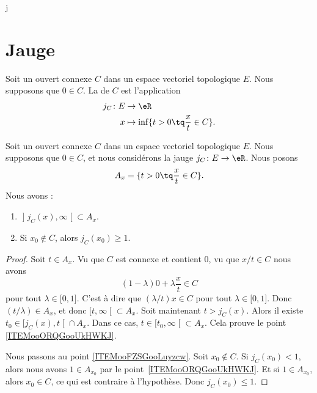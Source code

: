 j%

\section{Jauge}


\begin{definition}	\label{DEFooRNZBooLSdowc}
	Soit un ouvert connexe \( C\) dans un espace vectoriel topologique \( E\). Nous supposons que \( 0\in C\). La  de \( C\) est l'application
	\begin{equation}
		\begin{aligned}
			j_C\colon E & \to \eR                                        \\
			x           & \mapsto \inf\{ t>0\tq \frac{ x }{ t }\in C \}.
		\end{aligned}
	\end{equation}
\end{definition}

\begin{lemma}	\label{LEMooEUETooMAAnNO}
	Soit un ouvert connexe \( C\) dans un espace vectoriel topologique \( E\). Nous supposons que \( 0\in C\), et nous considérons la jauge \(j_C \colon E\to \eR  \). Nous posons
	\begin{equation}
		A_x=\{ t>0\tq \frac{ x }{ t }\in C \}.
	\end{equation}
	Nous avons :
	\begin{enumerate}
		\item		\label{ITEMooORQGooUkHWKJ}
		      \( \mathopen] j_C(x),\infty\mathclose[\subset A_x\).
		\item		\label{ITEMooFZSGooLuyzcw}
		      Si \( x_0\not\in C\), alors \( j_C(x_0)\geq 1\).
	\end{enumerate}
\end{lemma}

\begin{proof}
	Soit \( t\in A_x\). Vu que \( C\) est connexe et contient \( 0\), vu que \( x/t\in C\) nous avons
	\begin{equation}
		(1-\lambda)0+\lambda \frac{ x }{ t }\in C
	\end{equation}
	pour tout \( \lambda\in\mathopen[ 0,1\mathclose]\). C'est à dire que \( (\lambda/t)x\in C\) pour tout \( \lambda\in \mathopen[ 0,1\mathclose]\). Donc \( (t/\lambda)\in A_x\), et donc \( \mathopen[ t,\infty\mathclose[\subset A_x\). Soit maintenant \( t>j_C(x)\). Alors il existe \( t_0\in \mathopen[ j_C(x),t\mathclose[\cap A_x\). Dans ce cas, \( t\in \mathopen[ t_0,\infty\mathclose[\subset A_x\). Cela prouve le point \ref{ITEMooORQGooUkHWKJ}.

	Nous passons au point \ref{ITEMooFZSGooLuyzcw}. Soit \( x_0\not\in C\). Si \( j_C(x_0)<1\), alors nous avons \( 1\in A_{x_0}\) par le point~\ref{ITEMooORQGooUkHWKJ}. Et si \( 1\in A_{x_0}\), alors \( x_0\in C\), ce qui est contraire à l'hypothèse. Donc \( j_C(x_0)\leq 1\).
\end{proof}

